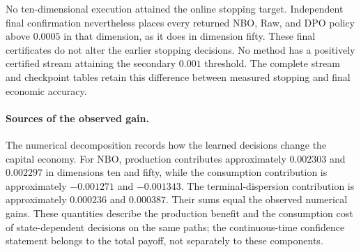 No ten-dimensional execution attained the online stopping target. Independent
final confirmation nevertheless places every returned NBO, Raw, and DPO
policy above $0.0005$ in that dimension, as it does in dimension fifty.
These final certificates do not alter the earlier stopping decisions.
No method has a positively certified stream attaining the secondary
$0.001$ threshold. The complete stream and checkpoint tables retain this
difference between measured stopping and final economic accuracy.

\paragraph*{Sources of the observed gain.}
The numerical decomposition records how the learned decisions change the
capital economy. For NBO, production contributes approximately $0.002303$
and $0.002297$ in dimensions ten and fifty, while the consumption contribution
is approximately $-0.001271$ and $-0.001343$. The terminal-dispersion
contribution is approximately $0.000236$ and $0.000387$. Their sums equal the
observed numerical gains. These quantities describe the production benefit
and the consumption cost of state-dependent decisions on the same paths;
the continuous-time confidence statement belongs to the total payoff,
not separately to these components.
